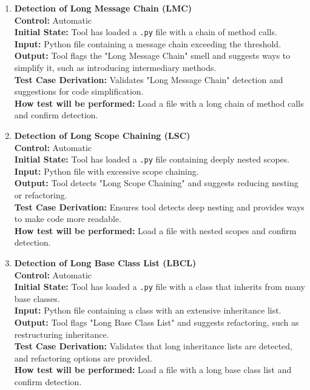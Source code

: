 \documentclass[12pt, titlepage]{article}
\begin{document}
\begin{enumerate}[label={\bf \textcolor{Maroon}{test-FR-CSD-\arabic*}}, wide=0pt, font=\itshape]
  \item \textbf{Detection of Long Message Chain (LMC)}\\[2mm]
    \textbf{Control:} Automatic \\
    \textbf{Initial State:} Tool has loaded a \texttt{.py} file with a chain of method calls.\\
    \textbf{Input:} Python file containing a message chain exceeding the threshold.\\
    \textbf{Output:} Tool flags the "Long Message Chain" smell and suggests ways to simplify it, such as introducing intermediary methods.\\[2mm]
    \textbf{Test Case Derivation:} Validates "Long Message Chain" detection and suggestions for code simplification.     \\[2mm]
    \textbf{How test will be performed:} Load a file with a long chain of method calls and confirm detection.

  \item \textbf{Detection of Long Scope Chaining (LSC)}\\[2mm]
    \textbf{Control:} Automatic \\
    \textbf{Initial State:} Tool has loaded a \texttt{.py} file containing deeply nested scopes.\\
    \textbf{Input:} Python file with excessive scope chaining.\\
    \textbf{Output:} Tool detects "Long Scope Chaining" and suggests reducing nesting or refactoring.\\[2mm]
    \textbf{Test Case Derivation:} Ensures tool detects deep nesting and provides ways to make code more readable.\\[2mm]
    \textbf{How test will be performed:} Load a file with nested scopes and confirm detection.

  \item \textbf{Detection of Long Base Class List (LBCL)}\\[2mm]
    \textbf{Control:} Automatic \\         
    \textbf{Initial State:} Tool has loaded a \texttt{.py} file with a class that inherits from many base classes.\\
    \textbf{Input:} Python file containing a class with an extensive inheritance list.\\
    \textbf{Output:} Tool flags "Long Base Class List" and suggests refactoring, such as restructuring inheritance.\\[2mm]
    \textbf{Test Case Derivation:} Validates that long inheritance lists are detected, and refactoring options are provided.\\[2mm]
    \textbf{How test will be performed:} Load a file with a long base class list and confirm detection.


\end{enumerate}
\end{document}
